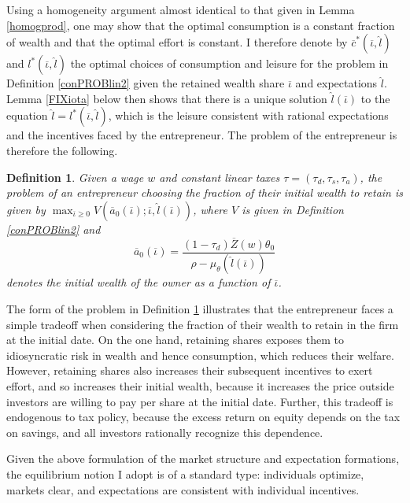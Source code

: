 \documentclass[11pt]{article}
\theoremstyle{plain}
\newtheorem{defn}{Definition}[section]
\begin{document}
Using a homogeneity argument almost identical to that given in Lemma \ref{homogprod}, one may show that the optimal consumption is a constant fraction of wealth and that the optimal effort is constant. I therefore denote by $\overline{c}^*(\overline{\iota}, \hat{l})$ and $l^*(\overline{\iota}, \hat{l})$ the optimal choices of consumption and leisure for the problem in Definition \ref{conPROBlin2} given the retained wealth share $\overline{\iota}$ and expectations $\hat{l}$. Lemma \ref{FIXiota} below then shows that there is a unique solution $\hat{l}(\overline{\iota})$ to the equation $\hat{l} = l^*(\overline{\iota}, \hat{l})$, which is the leisure consistent with rational expectations and the incentives faced by the entrepreneur. The problem of the entrepreneur is therefore the following. 

\begin{defn} \label{conPROBlin3}
Given a wage $w$ and constant linear taxes $\tau = (\tau_d,\tau_s,\tau_a)$, the problem of an entrepreneur choosing the fraction of their initial wealth to retain is given by $\max_{\overline{\iota} \geq 0} V(\overline{a}_0(\overline{\iota}); \overline{\iota}, \hat{l}(\overline{\iota}))$, where 
$V$ is given in Definition \ref{conPROBlin2} and 
\begin{equation}
\overline{a}_0(\overline{\iota}) = \frac{(1-\tau_d)\overline{Z}(w)\theta_0}{\rho - \mu_{\theta}(\hat{l}(\overline{\iota}))}
\label{initiala}
\end{equation}
denotes the initial wealth of the owner as a function of $\overline{\iota}$.
\end{defn} %

The form of the problem in Definition \ref{conPROBlin3} illustrates that the entrepreneur faces a simple tradeoff when considering the fraction of their wealth to retain in the firm at the initial date. On the one hand, retaining shares exposes them to idiosyncratic risk in wealth and hence consumption, which reduces their welfare. However, retaining shares also increases their subsequent incentives to exert effort, and so increases their initial wealth, because it increases the price outside investors are willing to pay per share at the initial date. Further, this tradeoff is endogenous to tax policy, because the excess return on equity depends on the tax on savings, and all investors rationally recognize this dependence. 


Given the above formulation of the market structure and expectation formations, the equilibrium notion I adopt is of a standard type: individuals optimize, markets clear, and expectations are consistent with individual incentives. 
\end{document}
